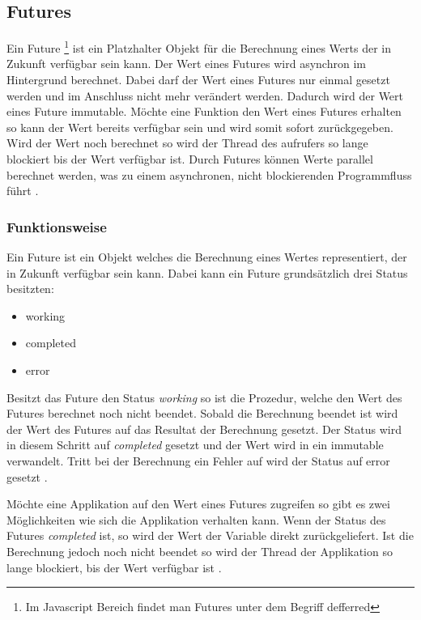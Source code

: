\subsection{Futures}
\label{section:futures}

Ein Future \footnote{Im Javascript Bereich findet man Futures unter dem Begriff defferred} ist ein Platzhalter Objekt für die Berechnung eines Werts der in Zukunft verfügbar sein kann. Der Wert eines Futures wird asynchron im Hintergrund berechnet. Dabei darf der Wert eines Futures nur einmal gesetzt werden und im Anschluss nicht mehr verändert werden. Dadurch wird der Wert eines Future immutable. Möchte eine Funktion den Wert eines Futures erhalten so kann der Wert bereits verfügbar sein und wird somit sofort zurückgegeben. Wird der Wert noch berechnet so wird der Thread des aufrufers so lange blockiert bis der Wert verfügbar ist. Durch Futures können Werte parallel berechnet werden, was zu einem asynchronen, nicht blockierenden Programmfluss führt \cite[]{ScalaFutures}. 

\subsubsection{Funktionsweise} 

Ein Future ist ein Objekt welches die Berechnung eines Wertes representiert, der in Zukunft verfügbar sein kann. Dabei kann ein Future grundsätzlich drei Status besitzten: 

\begin{itemize}
  \item working
  \item completed
  \item error
\end{itemize}  

Besitzt das Future den Status \emph{working} so ist die Prozedur, welche den Wert des Futures berechnet noch nicht beendet. Sobald die Berechnung beendet ist wird der Wert des Futures auf das Resultat der Berechnung gesetzt. Der Status wird in diesem Schritt auf \emph{completed} gesetzt und der Wert wird in ein immutable verwandelt. Tritt bei der Berechnung ein Fehler auf wird der Status auf error gesetzt \cite[]{ScalaFutures}. 

Möchte eine Applikation auf den Wert eines Futures zugreifen so gibt es zwei Möglichkeiten wie sich die Applikation verhalten kann. Wenn der Status des Futures \emph{completed} ist, so wird der Wert der Variable direkt zurückgeliefert. Ist die Berechnung jedoch noch nicht beendet so wird der Thread der Applikation so lange blockiert, bis der Wert verfügbar ist \cite[]{ScalaFutures}.

